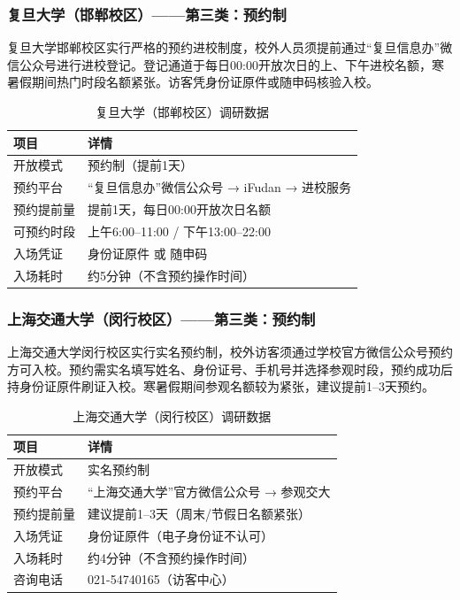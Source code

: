 \documentclass[12pt]{article}
\begin{document}
\subsubsection{复旦大学（邯郸校区）——第三类：预约制}

复旦大学邯郸校区实行严格的预约进校制度，校外人员须提前通过“复旦信息办”微信公众号进行进校登记。登记通道于每日00:00开放次日的上、下午进校名额，寒暑假期间热门时段名额紧张。访客凭身份证原件或随申码核验入校。

\begin{table}[H]
\centering
\caption{复旦大学（邯郸校区）调研数据}
\label{tab:fdu}
\begin{tabular}{p{3cm}p{7.5cm}}
\toprule
\textbf{项目} & \textbf{详情} \\
\midrule
开放模式 & 预约制（提前1天） \\
预约平台 & “复旦信息办”微信公众号 → iFudan → 进校服务 \\
预约提前量 & 提前1天，每日00:00开放次日名额 \\
可预约时段 & 上午6:00–11:00 / 下午13:00–22:00 \\
入场凭证 & 身份证原件 或 随申码 \\
入场耗时 & 约5分钟（不含预约操作时间） \\
\bottomrule
\end{tabular}
\end{table}

\subsubsection{上海交通大学（闵行校区）——第三类：预约制}

上海交通大学闵行校区实行实名预约制，校外访客须通过学校官方微信公众号预约方可入校。预约需实名填写姓名、身份证号、手机号并选择参观时段，预约成功后持身份证原件刷证入校。寒暑假期间参观名额较为紧张，建议提前1–3天预约。

\begin{table}[H]
\centering
\caption{上海交通大学（闵行校区）调研数据}
\label{tab:sjtu}
\begin{tabular}{p{3cm}p{7.5cm}}
\toprule
\textbf{项目} & \textbf{详情} \\
\midrule
开放模式 & 实名预约制 \\
预约平台 & “上海交通大学”官方微信公众号 → 参观交大 \\
预约提前量 & 建议提前1–3天（周末/节假日名额紧张） \\
入场凭证 & 身份证原件（电子身份证不认可） \\
入场耗时 & 约4分钟（不含预约操作时间） \\
咨询电话 & 021-54740165（访客中心） \\
\bottomrule
\end{tabular}
\end{table}
\end{document}

